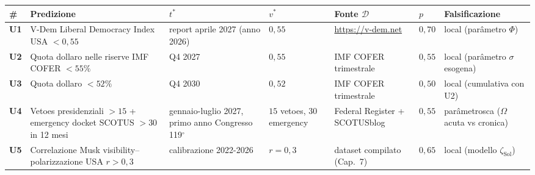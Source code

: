 {\def\LTcaptype{none} %
{\small\begin{longtable}[]{@{}
  >{\raggedright\arraybackslash}p{}
  >{\raggedright\arraybackslash}p{}
  >{\raggedright\arraybackslash}p{}
  >{\raggedright\arraybackslash}p{}
  >{\raggedright\arraybackslash}p{}
  >{\raggedright\arraybackslash}p{}
  >{\raggedright\arraybackslash}p{}@{}}
\toprule\noalign{}
\begin{minipage}[b]{\linewidth}\raggedright
\#
\end{minipage} & \begin{minipage}[b]{\linewidth}\raggedright
Predizione
\end{minipage} & \begin{minipage}[b]{\linewidth}\raggedright
\(t^*\)
\end{minipage} & \begin{minipage}[b]{\linewidth}\raggedright
\(v^*\)
\end{minipage} & \begin{minipage}[b]{\linewidth}\raggedright
Fonte \(\mathcal{D}\)
\end{minipage} & \begin{minipage}[b]{\linewidth}\raggedright
\(p\)
\end{minipage} & \begin{minipage}[b]{\linewidth}\raggedright
Falsificazione
\end{minipage} \\
\midrule\noalign{}
\endhead
\bottomrule\noalign{}
\endlastfoot
\textbf{U1} & V-Dem Liberal Democracy Index USA \(< 0{,}55\) & report
aprile 2027 (anno 2026) & \(0{,}55\) & \url{https://v-dem.net} &
\(0{,}70\) & local (parâmetro \(\Phi\)) \\
\textbf{U2} & Quota dollaro nelle riserve IMF COFER \(< 55\%\) & Q4 2027
& \(0{,}55\) & IMF COFER trimestrale & \(0{,}55\) & local (parâmetro
\(\sigma\) esogena) \\
\textbf{U3} & Quota dollaro \(< 52\%\) & Q4 2030 & \(0{,}52\) & IMF
COFER trimestrale & \(0{,}50\) & local (cumulativa con U2) \\
\textbf{U4} & Vetoes presidenziali \(> 15\) + emergency docket SCOTUS
\(> 30\) in 12 mesi & gennaio-luglio 2027, primo anno Congresso 119$^\circ$ &
\(15\) vetoes, \(30\) emergency & Federal Register + SCOTUSblog &
\(0{,}55\) & parâmetrosca (\(\Omega\) acuta vs cronica) \\
\textbf{U5} & Correlazione Musk visibility--polarizzazione USA
\(r > 0{,}3\) & calibrazione 2022-2026 & \(r = 0{,}3\) & dataset
compilato (Cap.~7) & \(0{,}65\) & local (modello
\(\zeta_{\text{Sol}}\)) \\
\end{longtable}}
}

